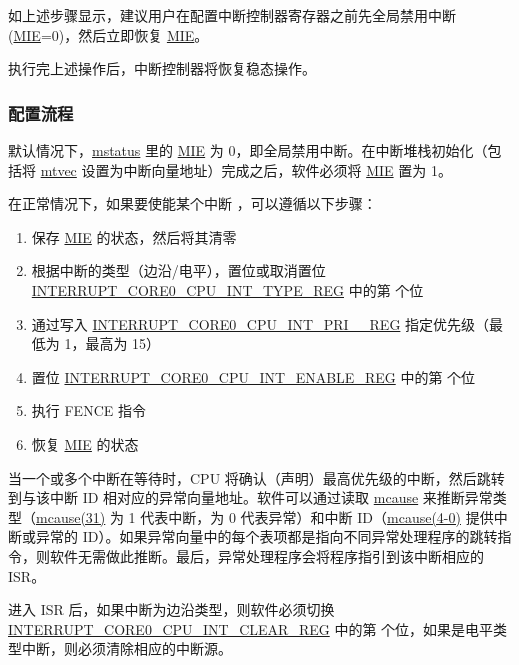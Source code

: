 \documentclass[main\_\_CN.tex]{subfiles}
\begin{document}
如上述步骤显示，建议用户在配置中断控制器寄存器之前先全局禁用中断 (\hyperref[fielddesc:MSTATUSMIE]{MIE}=0)，然后立即恢复 \hyperref[fielddesc:MSTATUSMIE]{MIE}。

执行完上述操作后，中断控制器将恢复稳态操作。

\subsubsection{配置流程}
\label{sec:riscvcpu-int-config}

默认情况下，\hyperref[regdesc:MSTATUS]{mstatus} 里的 \hyperref[fielddesc:MSTATUSMIE]{MIE} 为 0，即全局禁用中断。在中断堆栈初始化（包括将 \hyperref[regdesc:MTVEC]{mtvec} 设置为中断向量地址）完成之后，软件必须将 \hyperref[fielddesc:MSTATUSMIE]{MIE} 置为 1。

在正常情况下，如果要使能某个中断 ，可以遵循以下步骤：
\begin{enumerate}
    \item 保存 \hyperref[fielddesc:MSTATUSMIE]{MIE} 的状态，然后将其清零
    \item 根据中断的类型（边沿/电平），置位或取消置位 \hyperref[regdesc:INTERRUPTCORE0CPUINTTYPEREG]{INTERRUPT\_CORE0\_CPU\_INT\_TYPE\_REG} 中的第  个位
    \item 通过写入 \hyperref[regdesc:INTERRUPTCORE0CPUINTPRI0REG]{INTERRUPT\_CORE0\_CPU\_INT\_PRI\_\_REG} 指定优先级（最低为 1，最高为 15）
    \item 置位 \hyperref[regdesc:INTERRUPTCORE0CPUINTENABLEREG]{INTERRUPT\_CORE0\_CPU\_INT\_ENABLE\_REG} 中的第  个位
    \item 执行 FENCE 指令
    \item 恢复 \hyperref[fielddesc:MSTATUSMIE]{MIE} 的状态
\end{enumerate}

当一个或多个中断在等待时，CPU 将确认（声明）最高优先级的中断，然后跳转到与该中断 ID 相对应的异常向量地址。软件可以通过读取 \hyperref[regdesc:MCAUSE]{mcause} 来推断异常类型（\hyperref[fielddesc:MCAUSEINT]{mcause(31)} 为 1 代表中断，为 0 代表异常）和中断 ID（\hyperref[fielddesc:MCAUSECODE]{mcause(4-0)} 提供中断或异常的 ID）。如果异常向量中的每个表项都是指向不同异常处理程序的跳转指令，则软件无需做此推断。最后，异常处理程序会将程序指引到该中断相应的 ISR。

进入 ISR 后，如果中断为边沿类型，则软件必须切换 \hyperref[regdesc:INTERRUPTCORE0CPUINTCLEARREG]{INTERRUPT\_CORE0\_CPU\_INT\_CLEAR\_REG} 中的第  个位，如果是电平类型中断，则必须清除相应的中断源。
\end{document}
